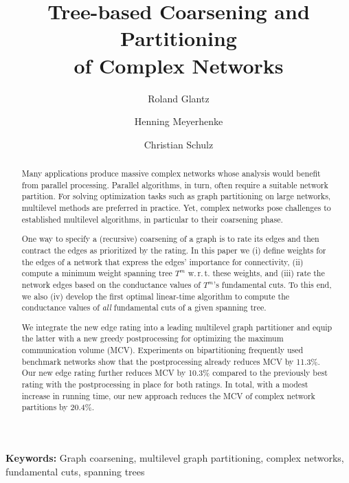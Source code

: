 \documentclass[pdftex]{llncs}
\newcommand{\wrt}{w.\,r.\,t.\xspace}
\numberwithin{equation}{section}
\numberwithin{example}{section}
\numberwithin{table}{section}
\begin{document}
\date{}


\title{Tree-based Coarsening and Partitioning \\ of Complex Networks}


\author{Roland Glantz \and Henning Meyerhenke \and Christian Schulz}

\maketitle
\vspace{-4mm}
\begin{abstract}
Many applications produce massive complex networks whose
  analysis would benefit from parallel processing.  Parallel
  algorithms, in turn, often require a suitable network partition.  For solving optimization tasks such as
  graph partitioning on large networks, multilevel methods are
  preferred in practice. Yet, complex networks pose  challenges to
  established multilevel algorithms, in particular to their coarsening
  phase.  

One way to specify a (recursive) coarsening of a graph is to
  rate its edges and then contract the edges as prioritized by the
  rating.  In this paper we (i) define weights for the edges of a
  network that express the edges' importance for connectivity, (ii)
  compute a minimum weight spanning tree $T^m$ \wrt these weights, and
  (iii) rate the network edges based on the conductance values of
  $T^m$'s fundamental cuts. To this end,  we also (iv) develop the first optimal
  linear-time algorithm to compute the conductance values of
  \emph{all} fundamental cuts of a given spanning tree.


We integrate the new edge rating into a leading multilevel graph
  partitioner and equip the latter with a new greedy postprocessing
  for optimizing the maximum communication volume (MCV).  Experiments
  on bipartitioning frequently used benchmark networks show that the
  postprocessing already reduces MCV by 11.3\%. Our new edge rating
  further reduces MCV by 10.3\% compared to the previously best rating
  with the postprocessing in place for both ratings. In total, with a
  modest increase in running time, our new approach reduces the MCV of
  complex network partitions by 20.4\%.
\end{abstract}
\vspace{-4mm}

\textbf{Keywords:} Graph coarsening, multilevel graph partitioning, complex networks, 
fundamental cuts, spanning trees
\end{document}
